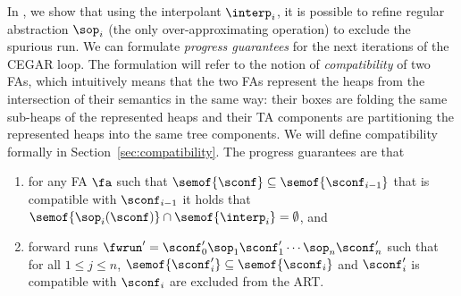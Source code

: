 In , we show that
using the interpolant $\interp_{i}$, 
it is possible to refine regular abstraction $\sop_i$ (the only over-approximating operation)
to exclude the spurious run.
We can formulate \emph{progress guarantees} for the next iterations of the CEGAR loop. 
%
The formulation will refer to the notion of \emph{compatibility} of two FAs,
which intuitively means that the two FAs represent the heaps from the
intersection of their semantics in the same way: their boxes are folding the
same sub-heaps of the represented heaps and their TA components are
partitioning the represented heaps into the same tree components. 
We will define compatibility formally in Section~\ref{sec:compatibility}.
%
The progress guarantees are that  
\begin{enumerate}
\item
for any FA $\fa$ such that  
$\semof{\sconf}\subseteq\semof{\sconf_{i-1}}$ 
that is compatible with $\sconf_{i-1}$ %
it holds that
$\semof{\sop_i(\sconf)} \cap \semof{\interp_i} = \emptyset$, and
%
\item
forward runs $\fwrun' = \sconf_0'\sop_1\sconf_1'\cdots\sop_n\sconf_n'$ such
that for all $1\leq j \leq n$, $\semof{\sconf_i'}\subseteq\semof{\sconf_i}$
and $\sconf_i'$ is compatible with $\sconf_i$ are excluded from the
ART.
\end{enumerate}
%
%
%
%
%
%
%

